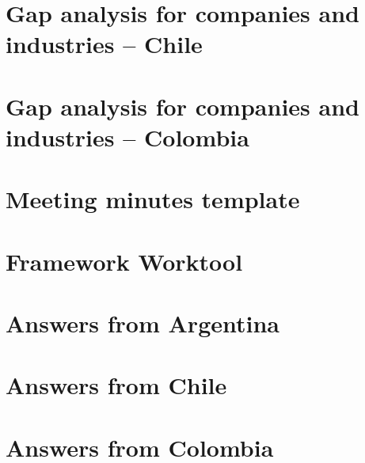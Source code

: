 \documentclass[
  12pt,
  oneside]{book}
\begin{document}


\section{Gap analysis for companies and industries --
Chile}\label{gap-analysis-for-companies-and-industries-chile}



\section{Gap analysis for companies and industries --
Colombia}\label{gap-analysis-for-companies-and-industries-colombia}



\section{Meeting minutes template}\label{meeting-minutes-template}



\section{Framework Worktool}\label{framework-worktool}



\section{Answers from Argentina}\label{answers-from-argentina}



\section{Answers from Chile}\label{answers-from-chile}



\section{Answers from Colombia}\label{answers-from-colombia}




\backmatter
\end{document}
